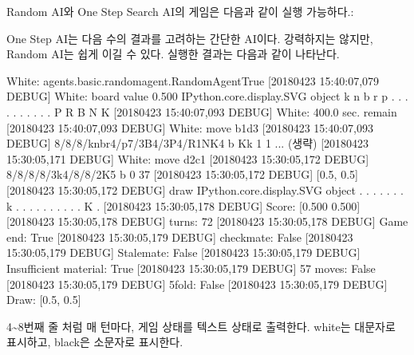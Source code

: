 \documentclass[letterpaper,10pt,english]{sphinxmanual}
\begin{document}
Random AI와 One Step Search AI의 게임은 다음과 같이 실행 가능하다.:

%
\begin{sphinxVerbatim}[commandchars=\\\{\}]
   
\end{sphinxVerbatim}

One Step AI는 다음 수의 결과를 고려하는 간단한 AI이다. 강력하지는 않지만, Random AI는 쉽게 이길 수 있다.
실행한 결과는 다음과 같이 나타난다.

%
\begin{sphinxVerbatim} White: agents.basic.random\PYGZus{}agent.RandomAgent\PYGZhy{}True
[2018\PYGZhy{}04\PYGZhy{}23 15:40:07,079 DEBUG] White: board value 0.500
\PYGZlt{}IPython.core.display.SVG object\PYGZgt{}
k n b r
p . . .
. . . .
. . . P
R B N K
[2018\PYGZhy{}04\PYGZhy{}23 15:40:07,093 DEBUG] White: 400.0 sec. remain
[2018\PYGZhy{}04\PYGZhy{}23 15:40:07,093 DEBUG] White: move b1d3
[2018\PYGZhy{}04\PYGZhy{}23 15:40:07,093 DEBUG] 8/8/8/knbr4/p7/3B4/3P4/R1NK4 b Kk \PYGZhy{} 1 1
...  (생략)
[2018\PYGZhy{}04\PYGZhy{}23 15:30:05,171 DEBUG] White: move d2c1
[2018\PYGZhy{}04\PYGZhy{}23 15:30:05,172 DEBUG] 8/8/8/8/3k4/8/8/2K5 b \PYGZhy{} \PYGZhy{} 0 37
[2018\PYGZhy{}04\PYGZhy{}23 15:30:05,172 DEBUG] [0.5, 0.5]
[2018\PYGZhy{}04\PYGZhy{}23 15:30:05,172 DEBUG] draw
\PYGZlt{}IPython.core.display.SVG object\PYGZgt{}
. . . .
. . . k
. . . .
. . . .
. . K .
[2018\PYGZhy{}04\PYGZhy{}23 15:30:05,178 DEBUG] Score: [0.500 0.500]
[2018\PYGZhy{}04\PYGZhy{}23 15:30:05,178 DEBUG] turns: 72
[2018\PYGZhy{}04\PYGZhy{}23 15:30:05,178 DEBUG] Game end: True
[2018\PYGZhy{}04\PYGZhy{}23 15:30:05,179 DEBUG] checkmate: False
[2018\PYGZhy{}04\PYGZhy{}23 15:30:05,179 DEBUG] Stalemate: False
[2018\PYGZhy{}04\PYGZhy{}23 15:30:05,179 DEBUG] Insufficient material: True
[2018\PYGZhy{}04\PYGZhy{}23 15:30:05,179 DEBUG] 57 moves: False
[2018\PYGZhy{}04\PYGZhy{}23 15:30:05,179 DEBUG] 5\PYGZhy{}fold: False
[2018\PYGZhy{}04\PYGZhy{}23 15:30:05,179 DEBUG] Draw: [0.5, 0.5]
\end{sphinxVerbatim}

4\textasciitilde{}8번째 줄 처럼 매 턴마다, 게임 상태를 텍스트 상태로 출력한다. white는 대문자로 표시하고, black은 소문자로 표시한다.
\end{document}
